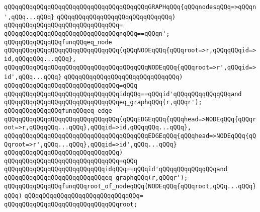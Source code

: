 \verb|qQQqqQQqqQQqqQQqqQQqqQQqqQQqqQQqqQQqqQQqGRAPHqQQq{qQQqnodesqQQq=>qQQqn',qQQq...qQQq}|\newline
\verb|qQQqqQQqqQQqqQQqqQQqqQQqqQQqqQQq)|\newline
\verb|qQQqqQQqqQQqqQQqqQQqqQQqqQQqqQQq=|\newline
\verb|qQQqqQQqqQQqqQQqqQQqqQQqqQQqqQQqnqQQq==qQQqn';|\newline
\newline
\verb|qQQqqQQqqQQqqQQqfunqQQqeq_node|\newline
\verb|qQQqqQQqqQQqqQQqqQQqqQQqqQQqqQQq(qQQqNODEqQQq{qQQqroot=>r,qQQqqQQqid=>id,qQQqqQQq...qQQq},|\newline
\verb|qQQqqQQqqQQqqQQqqQQqqQQqqQQqqQQqqQQqqQQqNODEqQQq{qQQqroot=>r',qQQqid=>id',qQQq...qQQq}|\newline
\verb|qQQqqQQqqQQqqQQqqQQqqQQqqQQqqQQq)|\newline
\verb|qQQqqQQqqQQqqQQqqQQqqQQqqQQqqQQq=qQQq|\newline
\verb|qQQqqQQqqQQqqQQqqQQqqQQqqQQqqQQqidqQQq==qQQqid'qQQqqQQqqQQqqQQqand|\newline
\verb|qQQqqQQqqQQqqQQqqQQqqQQqqQQqqQQqeq_graphqQQq(r,qQQqr');|\newline
\newline
\verb|qQQqqQQqqQQqqQQqfunqQQqeq_edge|\newline
\verb|qQQqqQQqqQQqqQQqqQQqqQQqqQQqqQQq(qQQqEDGEqQQq{qQQqhead=>NODEqQQq{qQQqroot=>r,qQQqqQQq...qQQq},qQQqid=>id,qQQqqQQq...qQQq},|\newline
\verb|qQQqqQQqqQQqqQQqqQQqqQQqqQQqqQQqqQQqqQQqEDGEqQQq{qQQqhead=>NODEqQQq{qQQqroot=>r',qQQq...qQQq},qQQqid=>id',qQQq...qQQq}|\newline
\verb|qQQqqQQqqQQqqQQqqQQqqQQqqQQqqQQq)|\newline
\verb|qQQqqQQqqQQqqQQqqQQqqQQqqQQqqQQq=qQQq|\newline
\verb|qQQqqQQqqQQqqQQqqQQqqQQqqQQqidqQQq==qQQqid'qQQqqQQqqQQqqQQqand|\newline
\verb|qQQqqQQqqQQqqQQqqQQqqQQqqQQqeq_graphqQQq(r,qQQqr');|\newline
\newline
\newline
\verb|qQQqqQQqqQQqqQQqfunqQQqroot_of_nodeqQQq(NODEqQQq{qQQqroot,qQQq...qQQq}qQQq)|\newline
\verb|qQQqqQQqqQQqqQQqqQQqqQQqqQQqqQQq=|\newline
\verb|qQQqqQQqqQQqqQQqqQQqqQQqqQQqqQQqroot;|\newline
\newline
